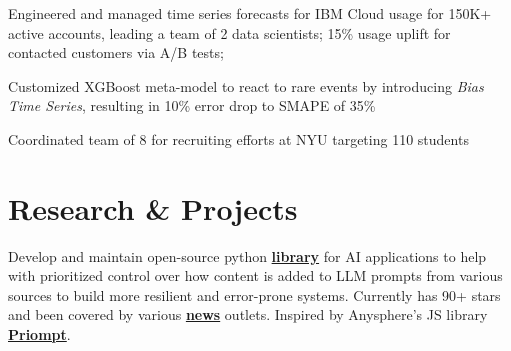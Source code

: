 \documentclass[]{deedy-resume-openfont}
\begin{document}
\begin{minipage}[t]{0.66\textwidth}
\begin{tightemize}
\end{tightemize}
\sectionsep

\begin{tightemize}
\item Engineered and managed time series forecasts for IBM Cloud usage for 150K+ active accounts, leading a team of 2 data scientists; 15\% usage uplift for contacted customers via A/B tests;
\item Customized XGBoost meta-model to react to rare events by introducing \textit{Bias Time Series}, resulting in 10\% error drop to SMAPE of 35\%
\item Coordinated team of 8 for recruiting efforts at NYU targeting 110 students
\end{tightemize}
\sectionsep




\section{Research \& Projects}

Develop and maintain open-source python \href{https://github.com/tg1482/priomptipy}{\bf library} for AI applications to help with prioritized control over how content is added to LLM prompts from various sources to build more resilient and error-prone systems. Currently has 90+ stars and been covered by various \href{https://www.marktechpost.com/2024/01/26/meet-priomptipy-a-python-library-to-budget-tokens-and-dynamically-render-prompts-for-llms/}{\bf news} outlets. Inspired by Anysphere's JS library \href{https://github.com/anysphere/priompt}{\bf Priompt}.
\sectionsep


\end{minipage}
\end{document}
